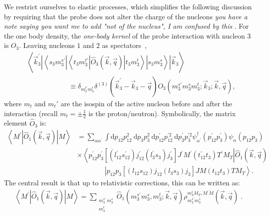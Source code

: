 \documentclass[a4paper,11pt]{article}
\newcommand\bv[1]{\vec{#1}}
\newcommand{\ques}[1]{\color{red}\textit{ #1 }\color{black}}
\begin{document}
We restrict ourselves to elastic processes, which simplifies the
following discussion by requiring that the probe does not alter the
charge of the nucleons \ques{you have a note saying you want me to add "not of the nucleus", I am confused by this}.
For the one body density, the \textit{one-body kernel} of the probe
interaction with nucleon 3 is $O_3$. Leaving nucleons $1$ and $2$ as
spectators~\cite{hammer2020},
\begin{align}
  &\left\langle\bv{k}_{3}^{\prime}\left|\left\langle s_{3} m_{3}^{s
  \prime}\left|\left\langle t_{3} m_{3}^{t
  \prime}\left|\hat{O}_{3}(\bv{k}, \bv{q})\right| t_{3}
  m_{3}^{t}\right\rangle\right| s_{3} m_{3}^{s}\right\rangle\right|
  \bv{k}_{3}\right\rangle \nonumber\\
  &\qquad\qquad\qquad \equiv \delta_{m_{3}^{t \prime} m_{3}^{t}}
  \delta^{(3)}\left(\bv{k}_{3}^{\prime}-\bv{k}_{3}-\bv{q}\right)
  O_{3}\left(m_{3}^{s \prime} m_{3}^{s} m_{3}^{t} ; \bv{k}_{3} ;
  \bv{k}, \bv{q}\right),\label{dirac}
\end{align}
where $m_t$ and $m_t'$ are the isospin of the active nucleon before
and after the interaction (recall $m_t= \pm \frac{1}{2}$ is the proton/neutron).
Symbolically, the matrix element $\hat{O}_3$ is:
\begin{align}
  \left\langle M^{\prime}\left|\hat{O}_{1}(\bv{k}, \bv{q})\right|
  M\right\rangle&=\sum_{\alpha \alpha^{\prime}} \int \mathrm{d}
  p_{12} p_{12}^{2} \mathrm{~d} p_{3} p_{3}^{2} \mathrm{~d}
  p_{12}^{\prime} p_{12}^{\prime 2} \mathrm{~d} p_{3}^{\prime}
  p_{3}^{\prime 2}
  \psi_{\alpha^{\prime}}^{\dagger}\left(p_{12}^{\prime}
  p_{3}^{\prime}\right) \psi_{\alpha}\left(p_{12} p_{3}\right)\nonumber \\
  &\times\left\langle p_{12}^{\prime}
  p_{3}^{\prime}\left[\left(l_{12}^{\prime} s_{12}^{\prime}\right)
    j_{12}^{\prime}\left(l_{3}^{\prime} s_{3}\right)
  j_{3}^{\prime}\right] J^{\prime} M^{\prime}\left(t_{12}^{\prime}
  t_{3}\right) T^{\prime} M_{T}\right| \hat{O}_{1}(\bv{k}, \bv{q})
  \label{onebodFull}\\
  &\qquad\qquad\left|p_{12} p_{3}\left[\left(l_{12} s_{12}\right)
  j_{12}\left(l_{3} s_{3}\right) j_{3}\right] J M\left(t_{12}
t_{3}\right) T M_{T}\right\rangle.\nonumber
\end{align}
The central result is that up to relativistic corrections, this can
be written as:
\begin{align}
  \left\langle M^{\prime}\left|\hat{O}_{1}(\bv{k}, \bv{q})\right|
  M\right\rangle=\sum_{\substack{m_{3}^{s \prime}\,
  m_{3}^{s}\\m_3^t}}\hat{O}_{1}\left(m_{3}^{s \prime} m_{3}^{s},
  m_{3}^{t} ;  \bv{k}, \bv{q}\right) \rho_{m_{3}^{s \prime}
  m_{3}^{s}}^{m_3^{t} M_{T}, M^{\prime} M}(\bv{k}, \bv{q})\label{onebodyOrig}\;.
\end{align}
\end{document}
